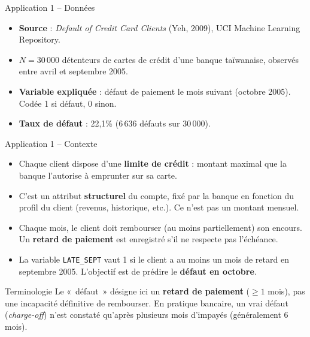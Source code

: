 \documentclass[11pt,aspectratio=169]{beamer}
\begin{document}
\begin{frame}{Application 1 -- Données}

\begin{itemize}

\item \textbf{Source} : \textit{Default of Credit Card Clients} (Yeh,
  2009), UCI Machine Learning Repository.\newline

\item $N = 30\,000$ détenteurs de cartes de crédit d'une banque
  taïwanaise, observés entre avril et septembre 2005.\newline

\item \textbf{Variable expliquée} : défaut de paiement le mois suivant
  (octobre 2005). Codée 1 si défaut, 0 sinon.\newline

\item \textbf{Taux de défaut} : 22,1\% ($6\,636$ défauts sur
  $30\,000$).

\end{itemize}

\end{frame}

\begin{frame}{Application 1 -- Contexte}

\begin{itemize}

\item Chaque client dispose d'une \textbf{limite de crédit} : montant
  maximal que la banque l'autorise à emprunter sur sa carte.\newline

\item C'est un attribut \textbf{structurel} du compte, fixé par la banque
  en fonction du profil du client (revenus, historique, etc.). Ce n'est
  pas un montant mensuel.\newline

\item Chaque mois, le client doit rembourser (au moins partiellement)
  son encours. Un \textbf{retard de paiement} est enregistré s'il ne
  respecte pas l'échéance.\newline

\item La variable \texttt{LATE\_SEPT} vaut 1 si le client a au moins un
  mois de retard en septembre 2005. L'objectif est de prédire le
  \textbf{défaut en octobre}.

\end{itemize}

\medskip

\begin{alertblock}{Terminologie}
Le «~défaut~» désigne ici un \textbf{retard de paiement} ($\geq 1$
mois), pas une incapacité définitive de rembourser. En pratique
bancaire, un vrai défaut (\textit{charge-off}) n'est constaté qu'après
plusieurs mois d'impayés (généralement 6 mois).
\end{alertblock}

\end{frame}
\end{document}
